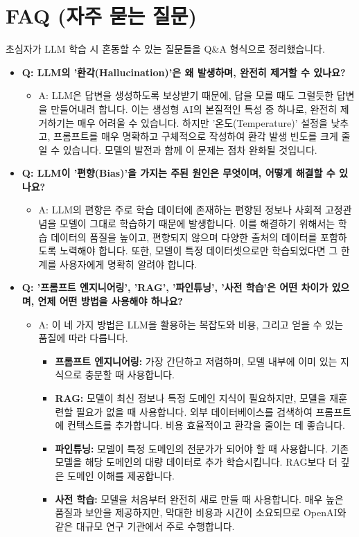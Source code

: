\documentclass[11pt,a4paper]{article}
\theoremstyle{definition}
\begin{document}
\newpage
\section{FAQ (자주 묻는 질문)}

초심자가 LLM 학습 시 혼동할 수 있는 질문들을 Q&A 형식으로 정리했습니다.

\begin{itemize}
    \item \textbf{Q: LLM의 '환각(Hallucination)'은 왜 발생하며, 완전히 제거할 수 있나요?}
    \begin{itemize}
        \item A: LLM은 답변을 생성하도록 보상받기 때문에, 답을 모를 때도 그럴듯한 답변을 만들어내려 합니다. 이는 생성형 AI의 본질적인 특성 중 하나로, 완전히 제거하기는 매우 어려울 수 있습니다. 하지만 '온도(Temperature)' 설정을 낮추고, 프롬프트를 매우 명확하고 구체적으로 작성하여 환각 발생 빈도를 크게 줄일 수 있습니다. 모델의 발전과 함께 이 문제는 점차 완화될 것입니다.
    \end{itemize}

    \item \textbf{Q: LLM이 '편향(Bias)'을 가지는 주된 원인은 무엇이며, 어떻게 해결할 수 있나요?}
    \begin{itemize}
        \item A: LLM의 편향은 주로 학습 데이터에 존재하는 편향된 정보나 사회적 고정관념을 모델이 그대로 학습하기 때문에 발생합니다. 이를 해결하기 위해서는 학습 데이터의 품질을 높이고, 편향되지 않으며 다양한 출처의 데이터를 포함하도록 노력해야 합니다. 또한, 모델이 특정 데이터셋으로만 학습되었다면 그 한계를 사용자에게 명확히 알려야 합니다.
    \end{itemize}

    \item \textbf{Q: '프롬프트 엔지니어링', 'RAG', '파인튜닝', '사전 학습'은 어떤 차이가 있으며, 언제 어떤 방법을 사용해야 하나요?}
    \begin{itemize}
        \item A: 이 네 가지 방법은 LLM을 활용하는 복잡도와 비용, 그리고 얻을 수 있는 품질에 따라 다릅니다.
        \begin{itemize}
            \item \textbf{프롬프트 엔지니어링:} 가장 간단하고 저렴하며, 모델 내부에 이미 있는 지식으로 충분할 때 사용합니다.
            \item \textbf{RAG:} 모델이 최신 정보나 특정 도메인 지식이 필요하지만, 모델을 재훈련할 필요가 없을 때 사용합니다. 외부 데이터베이스를 검색하여 프롬프트에 컨텍스트를 추가합니다. 비용 효율적이고 환각을 줄이는 데 좋습니다.
            \item \textbf{파인튜닝:} 모델이 특정 도메인의 전문가가 되어야 할 때 사용합니다. 기존 모델을 해당 도메인의 대량 데이터로 추가 학습시킵니다. RAG보다 더 깊은 도메인 이해를 제공합니다.
            \item \textbf{사전 학습:} 모델을 처음부터 완전히 새로 만들 때 사용합니다. 매우 높은 품질과 보안을 제공하지만, 막대한 비용과 시간이 소요되므로 OpenAI와 같은 대규모 연구 기관에서 주로 수행합니다.
        \end{itemize}
    \end{itemize}


\end{itemize}
\end{document}
